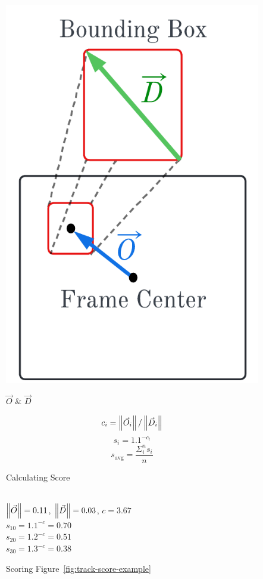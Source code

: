 \begin{figure}
\centering
\begin{minipage}{0.35\linewidth}
\centering
\includegraphics[width=\linewidth]{chapter6/FIGS/fig-tracking-scoring.png}
\caption{\small $\vec{O}$ \& $\vec{D}$}
\label{fig:o-d-calc}
\end{minipage}
\begin{minipage}{0.5\linewidth}
\small
\begin{equation}
	c_i = \left\lVert\vec{O}_i\right\rVert / \left\lVert\vec{D}_i\right\rVert\label{eq:2}
\end{equation}
\begin{equation}
	s_{i} = 1.1^{-c_i}\label{eq:3}
\end{equation}
\begin{equation}
	s_{\text{avg}} = \frac{\Sigma_i^n s_i}{n}\label{eq:4}
\end{equation}
\caption{Calculating Score}
{\centering\small\\[0.2cm]
$\left\lVert\vec{O}\right\rVert = 0.11$, $\left\lVert\vec{D}\right\rVert = 0.03$, $c = 3.67$ \\[0.1in]
$s_{10} = 1.1^{-c} = 0.70$ \\
$s_{20} = 1.2^{-c} = 0.51$ \\
$s_{30} = 1.3^{-c} = 0.38$ \\
}
\caption{Scoring Figure~\ref{fig:track-score-example}}
\label{fig:example-score-calcuclation}
\end{minipage}
\end{figure}

